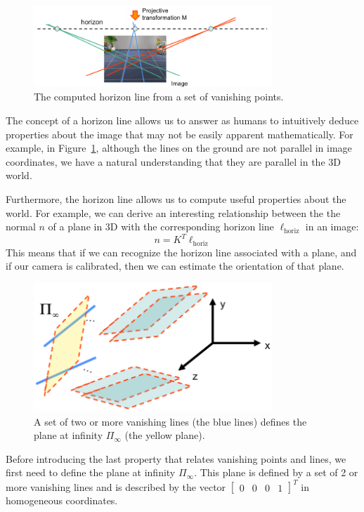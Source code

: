 \documentclass[a4paper, 12pt]{article}
\begin{document}
\begin{figure}[h!]
\centering
\includegraphics[width=0.8\textwidth]{figures/horizon.png}
\caption{The computed horizon line from a set of vanishing points.}
\label{fig:horizon}
\end{figure}

The concept of a horizon line allows us to answer as humans to intuitively deduce properties about the image that may not be easily apparent mathematically. For example, in Figure~\ref{fig:horizon}, although the lines on the ground are not parallel in image coordinates, we have a natural understanding that they are parallel in the 3D world.

Furthermore, the horizon line allows us to compute useful properties about the world. For example, we can derive an interesting relationship between the the normal $n$ of a plane in 3D with the corresponding horizon line $\ell_{\mathrm{horiz}}$ in an image:
\begin{equation}
n = K^T \ell_{\mathrm{horiz}}
\end{equation}
This means that if we can recognize the horizon line associated with a plane, and if our camera is calibrated, then we can estimate the orientation of that plane.
\begin{figure}[h!]
\centering
\includegraphics[width=0.8\textwidth]{figures/plane_infinity.png}
\caption{A set of two or more vanishing lines (the blue lines) defines the plane at infinity $\Pi_\infty$ (the yellow plane).}
\label{fig:plane_infinity}
\end{figure}
Before introducing the last property that relates vanishing points and lines, we first need to define the plane at infinity $\Pi_\infty$. This plane is defined by a set of 2 or more vanishing lines and is described by the vector $\begin{bmatrix} 0 & 0 & 0 &1\end{bmatrix}^T$ in homogeneous coordinates. 
\end{document}
